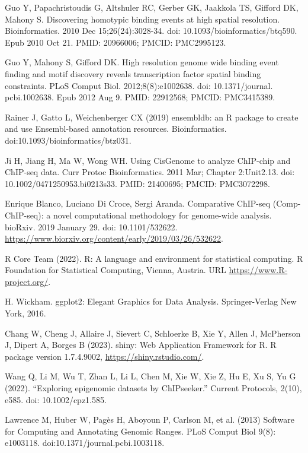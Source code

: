 \documentclass[12pt]{article}
\begin{document}
\begin{thebibliography}{99}
 Guo Y, Papachristoudis G, Altshuler RC, Gerber GK, Jaakkola
TS, Gifford DK, Mahony S. Discovering homotypic binding events at high spatial
resolution. Bioinformatics. 2010 Dec 15;26(24):3028-34.
doi: 10.1093/bioinformatics/btq590. Epub 2010 Oct 21. PMID: 20966006;
PMCID: PMC2995123.

 Guo Y, Mahony S, Gifford DK. High resolution genome wide
binding event finding and motif discovery reveals transcription factor spatial
binding constraints. PLoS Comput Biol. 2012;8(8):e1002638. doi: 10.1371/journal.
pcbi.1002638. Epub 2012 Aug 9. PMID: 22912568; PMCID: PMC3415389.

 Rainer J, Gatto L, Weichenberger CX (2019) ensembldb: an R
package to create and use Ensembl-based annotation resources. Bioinformatics.
doi:10.1093/bioinformatics/btz031.

 Ji H, Jiang H, Ma W, Wong WH. Using CisGenome to analyze
ChIP-chip and ChIP-seq data. Curr Protoc Bioinformatics. 2011 Mar;
Chapter 2:Unit2.13. doi: 10.1002/0471250953.bi0213s33. PMID: 21400695;
PMCID: PMC3072298.

 Enrique Blanco, Luciano Di Croce, Sergi Aranda. Comparative
ChIP-seq (Comp-ChIP-seq): a novel computational methodology for genome-wide
analysis. bioRxiv. 2019 January 29. doi: 10.1101/532622. \newline
\url{https://www.biorxiv.org/content/early/2019/03/26/532622}.

 R Core Team (2022). R: A language and environment for statistical
computing. R Foundation for Statistical Computing, Vienna, Austria. URL
\url{https://www.R-project.org/}.

 H. Wickham. ggplot2: Elegant Graphics for Data Analysis.
Springer-Verlag New York, 2016.

 Chang W, Cheng J, Allaire J, Sievert C, Schloerke B, Xie Y,
Allen J, McPherson J, Dipert A, Borges B (2023). shiny: Web Application
Framework for R. R package version 1.7.4.9002, \url{https://shiny.rstudio.com/}.

 Wang Q, Li M, Wu T, Zhan L, Li L, Chen M, Xie W, Xie Z,
Hu E, Xu S, Yu G (2022). “Exploring epigenomic datasets by ChIPseeker.”
Current Protocols, 2(10), e585. doi: 10.1002/cpz1.585.

 Lawrence M, Huber W, Pag\`es H, Aboyoun P, Carlson M,
et al. (2013) Software for Computing and Annotating Genomic Ranges. PLoS Comput
Biol 9(8): e1003118. doi:10.1371/journal.pcbi.1003118.


\end{thebibliography}
\end{document}
